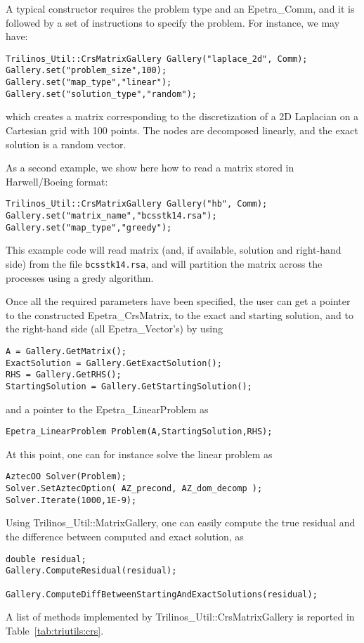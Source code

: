A typical constructor requires the problem type and an Epetra\_Comm, and
it is followed by a set of instructions to specify the problem. For
instance, we may have:
\begin{verbatim}
Trilinos_Util::CrsMatrixGallery Gallery("laplace_2d", Comm);
Gallery.set("problem_size",100);
Gallery.set("map_type","linear");
Gallery.set("solution_type","random");
\end{verbatim}
which creates a matrix corresponding to the discretization of a 2D
Laplacian on a Cartesian grid with 100 points. The nodes are decomposed
linearly, and the exact solution is a random vector.

As a second example, we show here how to read a matrix stored in
Harwell/Boeing format:
\begin{verbatim}
Trilinos_Util::CrsMatrixGallery Gallery("hb", Comm);
Gallery.set("matrix_name","bcsstk14.rsa");
Gallery.set("map_type","greedy");
\end{verbatim}
This example code will read matrix (and, if available, solution and
right-hand side) from the file \verb!bcsstk14.rsa!, and will partition
the matrix across the processes using a gredy algorithm.

\bigskip

Once all the required parameters have been specified, the user can get a
pointer to the constructed Epetra\_CrsMatrix, to the exact and starting
solution, and to the right-hand side (all Epetra\_Vector's) by using
\begin{verbatim}
A = Gallery.GetMatrix();
ExactSolution = Gallery.GetExactSolution();
RHS = Gallery.GetRHS();
StartingSolution = Gallery.GetStartingSolution();
\end{verbatim}
and a pointer to the Epetra\_LinearProblem as
\begin{verbatim}  
Epetra_LinearProblem Problem(A,StartingSolution,RHS);
\end{verbatim}
At this point, one can for instance solve the linear problem as
\begin{verbatim}  
AztecOO Solver(Problem);
Solver.SetAztecOption( AZ_precond, AZ_dom_decomp );  
Solver.Iterate(1000,1E-9);
\end{verbatim}
Using Trilinos\_Util::MatrixGallery, one can easily compute the true
residual and the difference between computed and exact solution, as
\begin{verbatim} 
double residual;
Gallery.ComputeResidual(residual);
  
Gallery.ComputeDiffBetweenStartingAndExactSolutions(residual);
\end{verbatim}
A list of methods implemented by Trilinos\_Util::CrsMatrixGallery is
reported in Table~\ref{tab:triutils:crs}.

